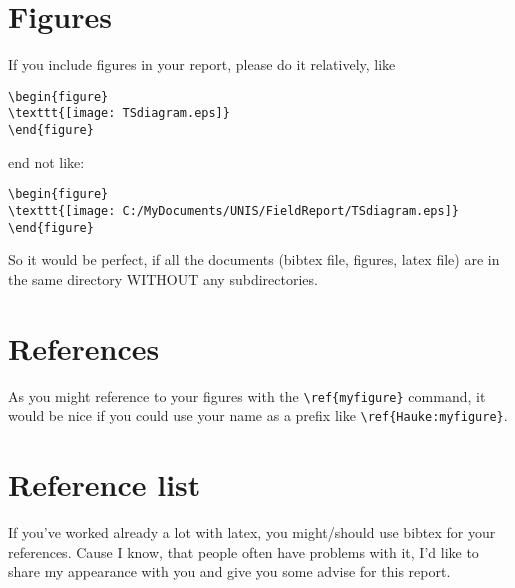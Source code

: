 \documentclass[12pt,a4paper,notitlepage]{scrreprt}
\begin{document}
\section{Figures}
If you include figures in your report, please do it relatively, like
\begin{verbatim}
\begin{figure}
\texttt{[image: TSdiagram.eps]}
\end{figure}
\end{verbatim}
end not like:
\begin{verbatim}
\begin{figure}
\texttt{[image: C:/MyDocuments/UNIS/FieldReport/TSdiagram.eps]}
\end{figure}
\end{verbatim}
So it would be perfect, if all the documents (bibtex file, figures, latex file) are in the same directory WITHOUT any subdirectories.
\section{References}
As you might reference to your figures with the \verb#\ref{myfigure}# command, it would be nice if you could use your name as a prefix like \verb#\ref{Hauke:myfigure}#.

\section{Reference list}
If you've worked already a lot with latex, you might/should use bibtex for your references. Cause I know, that people often have problems with it, I'd like to share my appearance with you and give you some advise for this report.
\end{document}
